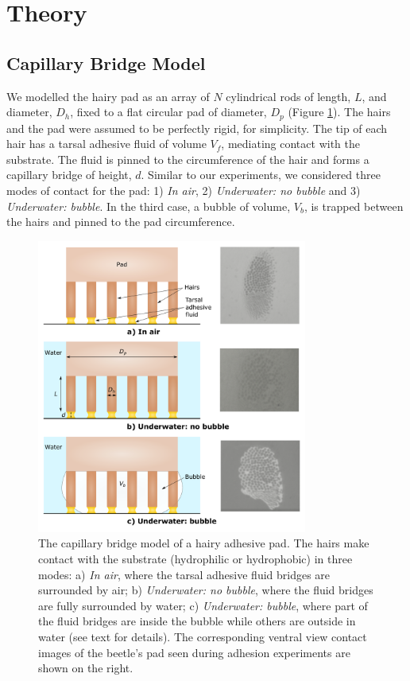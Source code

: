 \documentclass[vruler,JEB]{COB}%
\begin{document}
\section{Theory}

\subsection{Capillary Bridge Model}

We modelled the hairy pad as an array of $N$ cylindrical rods of length,
$L$, and diameter, $D_{h}$, fixed to a flat circular pad of diameter,
$D_{p}$ (Figure \ref{fig:Model}). The hairs and the pad were assumed
to be perfectly rigid, for simplicity. The tip of each hair has a tarsal 
adhesive fluid of volume $V_{f}$, mediating contact with the substrate.
The fluid is pinned to the circumference of the hair and forms a capillary
bridge of height, $d$. Similar to our experiments, we considered three
modes of contact for the pad: 1) \emph{In air}, 2) \emph{Underwater:
no bubble} and 3) \emph{Underwater: bubble}. In the third case, a
bubble of volume, $V_{b}$, is trapped between the hairs and pinned
to the pad circumference.

\begin{figure}
\includegraphics[width=3.5in]{Figure3-Model_schematic}
\caption{\label{fig:Model}The capillary bridge model of a hairy adhesive pad. The hairs make contact
with the substrate (hydrophilic or hydrophobic) in three modes: a) \emph{In air}, where the tarsal adhesive
fluid bridges are surrounded by air; b) \emph{Underwater: no bubble},
where the fluid bridges are fully surrounded by water; c)\emph{
Underwater: bubble}, where part of the fluid bridges are
inside the bubble while others are outside in water (see text for details). The corresponding
ventral view contact images of the beetle's pad seen during adhesion experiments are shown on the right.}
\end{figure}
\end{document}
